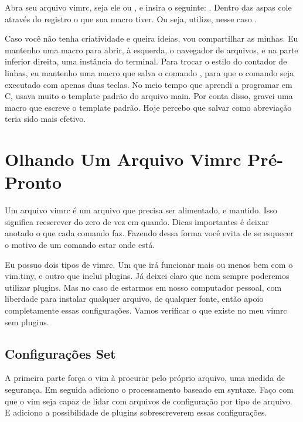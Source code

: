 Abra seu arquivo vimrc, seja ele  ou , e insira o seguinte:
.
Dentro das aspas cole através do registro o que sua macro tiver.
Ou seja, utilize, nesse caso .

Caso você não tenha criatividade e queira ideias, vou compartilhar as minhas.
Eu mantenho uma macro para abrir, à esquerda,
o navegador de arquivos, e na parte inferior direita, uma instância do terminal.
Para trocar o estilo do contador de linhas, eu mantenho uma macro que salva o comando
, para que o comando seja executado com apenas duas teclas.
No meio tempo que aprendi a programar em C, usava muito o template padrão do arquivo main.
Por conta disso, gravei uma macro que escreve o template padrão.
Hoje percebo que salvar como abreviação teria sido mais efetivo.


\section{Olhando Um Arquivo Vimrc Pré-Pronto}
Um arquivo vimrc é um arquivo que precisa ser alimentado, e mantido.
Isso significa reescrever do zero de vez em quando.
Dicas importantes é deixar anotado o que cada comando faz.
Fazendo dessa forma você evita de se esquecer o motivo de um comando estar onde está.

Eu possuo dois tipos de vimrc.
Um que irá funcionar mais ou menos bem com o vim.tiny, e outro que inclui plugins.
Já deixei claro que nem sempre poderemos utilizar plugins.
Mas no caso de estarmos em nosso computador pessoal, com liberdade para instalar qualquer arquivo,
de qualquer fonte, então apoio completamente essas configurações.
Vamos verificar o que existe no meu vimrc sem plugins.


\subsection{Configurações Set}

A primeira parte força o vim à procurar pelo próprio arquivo,
uma medida de segurança.
Em seguida adiciono o processamento baseado em syntaxe.
Faço com que o vim seja capaz de lidar com arquivos de configuração por tipo de arquivo.
E adiciono a possibilidade de plugins sobrescreverem essas configurações.

